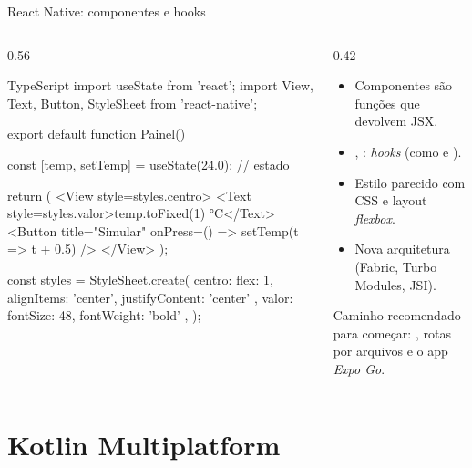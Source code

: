 \documentclass[aspectratio=169,10pt]{beamer}
\begin{document}
\begin{frame}[fragile]{React Native: componentes e hooks}
  \begin{columns}[T]
    \begin{column}{0.56\textwidth}
\begin{codigo}[title=app/index.tsx (Expo)]{TypeScript}
import { useState } from 'react';
import { View, Text, Button, StyleSheet } from 'react-native';

export default function Painel() {
  const [temp, setTemp] = useState(24.0);   // estado

  return (
    <View style={styles.centro}>
      <Text style={styles.valor}>{temp.toFixed(1)} °C</Text>
      <Button title="Simular"
        onPress={() => setTemp(t => t + 0.5)} />
    </View>
  );
}

const styles = StyleSheet.create({
  centro: { flex: 1, alignItems: 'center',
            justifyContent: 'center' },
  valor: { fontSize: 48, fontWeight: 'bold' },
});
\end{codigo}
    \end{column}
    \begin{column}{0.42\textwidth}
      \begin{conceito}[Conceitos]
        \begin{itemize}
          \item Componentes são funções que devolvem JSX.
          \item {}, : \emph{hooks} (como  e ).
          \item Estilo parecido com CSS e layout \emph{flexbox}.
          \item Nova arquitetura (Fabric, Turbo Modules, JSI).
        \end{itemize}
      \end{conceito}
      \begin{dica}[Expo]
        Caminho recomendado para começar: , rotas por arquivos e o app \emph{Expo Go}.
      \end{dica}
    \end{column}
  \end{columns}
\end{frame}

\section{Kotlin Multiplatform}
\end{document}

